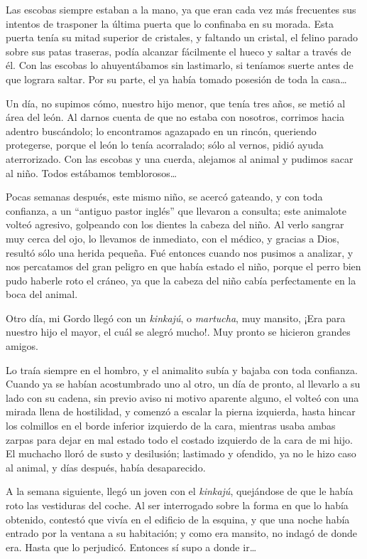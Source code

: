 \documentclass[letterpaper, 12pt]{book}
\begin{document}
Las escobas siempre estaban a la mano, ya que eran cada vez más frecuentes sus intentos de trasponer la última puerta que lo confinaba en su morada. Esta puerta tenía su mitad superior de cristales, y faltando un cristal, el felino parado sobre sus patas traseras, podía alcanzar fácilmente el hueco y saltar a través de él. Con las escobas lo ahuyentábamos sin lastimarlo, si teníamos suerte antes de que lograra saltar. Por su parte, el ya había tomado posesión de toda la casa\ldots

Un día, no supimos cómo, nuestro hijo menor, que tenía tres años, se metió al área del león. Al darnos cuenta de que no estaba con nosotros, corrimos hacia adentro buscándolo; lo encontramos agazapado en un rincón, queriendo protegerse, porque el león lo tenía acorralado; sólo al vernos, pidió ayuda aterrorizado. Con las escobas y una cuerda, alejamos al animal y pudimos sacar al niño. Todos estábamos temblorosos\ldots

Pocas semanas después, este mismo niño, se acercó gateando, y con toda confianza, a un ``antiguo pastor inglés'' que llevaron a consulta; este animalote volteó agresivo, golpeando con los dientes la cabeza del niño. Al verlo sangrar muy cerca del ojo, lo llevamos de inmediato, con el médico, y gracias a Dios, resultó sólo una herida pequeña. Fué entonces cuando nos pusimos a analizar, y nos percatamos del gran peligro en que había estado el niño, porque el perro bien pudo haberle roto el cráneo, ya que la cabeza del niño cabía perfectamente en la boca del animal.

Otro día, mi Gordo llegó con un \textit{kinkajú}, o \textit{martucha}, muy mansito, ¡Era para nuestro hijo el mayor, el cuál se alegró mucho!. Muy pronto se hicieron grandes amigos.

Lo traía siempre en el hombro, y el animalito subía y bajaba con toda confianza. Cuando ya se habían acostumbrado uno al otro, un día de pronto, al llevarlo a su lado con su cadena, sin previo aviso ni motivo aparente alguno, el volteó con una mirada llena de hostilidad, y comenzó a escalar la pierna izquierda, hasta hincar los colmillos en el borde inferior izquierdo de la cara, mientras usaba ambas zarpas para dejar en mal estado todo el costado izquierdo de la cara de mi hijo. El muchacho lloró de susto y desilusión; lastimado y ofendido, ya no le hizo caso al animal, y días después, había desaparecido.

A la semana siguiente, llegó un joven con el \textit{kinkajú}, quejándose de que le había roto las vestiduras del coche. Al ser interrogado sobre la forma en que lo había obtenido, contestó que vivía en el edificio de la esquina, y que una noche había entrado por la ventana a su habitación; y como era mansito, no indagó de donde era. Hasta que lo perjudicó. Entonces sí supo a donde ir\ldots
\end{document}
